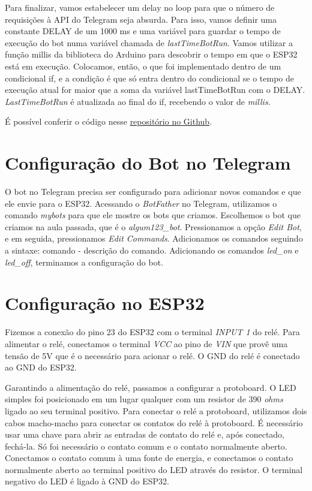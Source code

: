 \documentclass[12pt]{article}
\begin{document}
Para finalizar, vamos estabelecer um delay no loop para que o número de requisições à API do Telegram seja absurda. Para isso, vamos definir uma constante DELAY de um 1000 ms e uma variável para guardar o tempo de execução do bot numa variável chamada de \textit{lastTimeBotRun}. Vamos utilizar a função millis da biblioteca do Arduino para descobrir o tempo em que o ESP32 está em execução. Colocamos, então, o que foi implementado dentro de um condicional if, e a condição é que só entra dentro do condicional se o tempo de execução atual for maior que a soma da variável lastTimeBotRun com o DELAY. \textit{LastTimeBotRun} é atualizada ao final do if, recebendo o valor de \textit{millis}.

É possível conferir o código nesse \href{https://github.com/fabricio-araujo94/microcontroladores/tree/main/acionamento_rele}{repositório no Github}.

\section{Configuração do Bot no Telegram}

O bot no Telegram precisa ser configurado para adicionar novos comandos e que ele envie para o ESP32. Acessando o \textit{BotFather} no Telegram, utilizamos o comando \textit{mybots} para que ele mostre os bots que criamos. Escolhemos o bot que criamos na aula passada, que é o \textit{algum123\_bot}. Pressionamos a opção \textit{Edit Bot}, e em seguida, pressionamos \textit{Edit Commands}. Adicionamos os comandos seguindo a sintaxe: comando - descrição do comando. Adicionando os comandos \textit{led\_on} e \textit{led\_off}, terminamos a configuração do bot.


\section{Configuração no ESP32}\label{sec:configuração-no-esp32}

Fizemos a conexão do pino 23 do ESP32 com o terminal \textit{INPUT 1} do relé. Para alimentar o relé, conectamos o terminal \textit{VCC} ao pino de \textit{VIN} que provê uma tensão de 5V que é o necessário para acionar o relé. O GND do relé é conectado ao GND do ESP32.

Garantindo a alimentação do relé, passamos a configurar a protoboard. O LED simples foi posicionado em um lugar qualquer com um resistor de 390 \textit{ohms} ligado ao seu terminal positivo. Para conectar o relé a protoboard, utilizamos dois cabos macho-macho para conectar os contatos do relé à protoboard. É necessário usar uma chave para abrir as entradas de contato do relé e, após conectado, fechá-la. Só foi necessário o contato comum e o contato normalmente aberto. Conectamos o contato comum à uma fonte de energia, e conectamos o contato normalmente aberto ao terminal positivo do LED através do resistor. O terminal negativo do LED é ligado à GND do ESP32.
\end{document}
